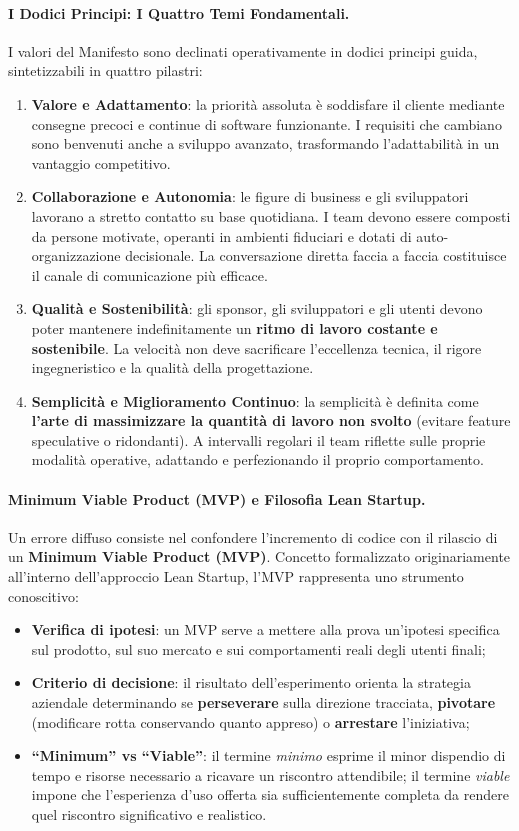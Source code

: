 \documentclass[12pt]{extarticle}
\begin{document}
\paragraph{I Dodici Principi: I Quattro Temi Fondamentali.}
I valori del Manifesto sono declinati operativamente in dodici principi guida, sintetizzabili in quattro pilastri:
\begin{enumerate}
    \item \textbf{Valore e Adattamento}: la priorità assoluta è soddisfare il cliente mediante consegne precoci e continue di software funzionante. I requisiti che cambiano sono benvenuti anche a sviluppo avanzato, trasformando l'adattabilità in un vantaggio competitivo.
    \item \textbf{Collaborazione e Autonomia}: le figure di business e gli sviluppatori lavorano a stretto contatto su base quotidiana. I team devono essere composti da persone motivate, operanti in ambienti fiduciari e dotati di auto-organizzazione decisionale. La conversazione diretta faccia a faccia costituisce il canale di comunicazione più efficace.
    \item \textbf{Qualità e Sostenibilità}: gli sponsor, gli sviluppatori e gli utenti devono poter mantenere indefinitamente un \textbf{ritmo di lavoro costante e sostenibile}. La velocità non deve sacrificare l'eccellenza tecnica, il rigore ingegneristico e la qualità della progettazione.
    \item \textbf{Semplicità e Miglioramento Continuo}: la semplicità è definita come \textbf{l'arte di massimizzare la quantità di lavoro non svolto} (evitare feature speculative o ridondanti). A intervalli regolari il team riflette sulle proprie modalità operative, adattando e perfezionando il proprio comportamento.
\end{enumerate}

\paragraph{Minimum Viable Product (MVP) e Filosofia Lean Startup.}
Un errore diffuso consiste nel confondere l'incremento di codice con il rilascio di un \textbf{Minimum Viable Product (MVP)}. Concetto formalizzato originariamente all'interno dell'approccio Lean Startup, l'MVP rappresenta uno strumento conoscitivo:
\begin{itemize}
    \item \textbf{Verifica di ipotesi}: un MVP serve a mettere alla prova un'ipotesi specifica sul prodotto, sul suo mercato e sui comportamenti reali degli utenti finali;
    \item \textbf{Criterio di decisione}: il risultato dell'esperimento orienta la strategia aziendale determinando se \textbf{perseverare} sulla direzione tracciata, \textbf{pivotare} (modificare rotta conservando quanto appreso) o \textbf{arrestare} l'iniziativa;
    \item \textbf{``Minimum'' vs ``Viable''}: il termine \textit{minimo} esprime il minor dispendio di tempo e risorse necessario a ricavare un riscontro attendibile; il termine \textit{viable} impone che l'esperienza d'uso offerta sia sufficientemente completa da rendere quel riscontro significativo e realistico.
\end{itemize}
\end{document}
